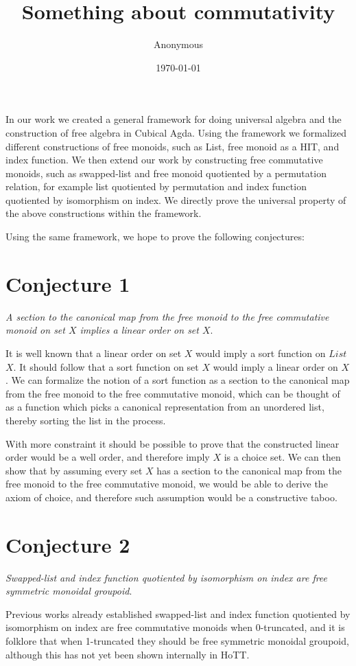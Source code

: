 \documentclass{article}
\title{Something about commutativity}
\author{Anonymous}
\date{\today}
\begin{document}
\maketitle

In our work we created a general framework for doing universal algebra and the construction of
free algebra in Cubical Agda. Using the framework we formalized different constructions of free monoids,
such as List, free monoid as a HIT, and index function. We then extend our work by constructing free commutative monoids,
such as swapped-list and free monoid quotiented by a permutation relation, for example list quotiented by permutation
and index function quotiented by isomorphism on index. We directly prove the universal property of the above constructions
within the framework.

Using the same framework, we hope to prove the following conjectures:

\section{Conjecture 1}
\textit{A section to the canonical map from the free monoid to the free commutative monoid on set $X$ implies a linear order on set $X$}.

It is well known that a linear order on set $X$ would imply a sort function on $List$ $X$. It should follow that a sort function on set $X$
would imply a linear order on $X$. We can formalize the notion of a sort function as a section to the canonical map from the free monoid to the
free commutative monoid, which can be thought of as a function which picks a canonical representation from an unordered list, thereby sorting
the list in the process.

With more constraint it should be possible to prove that the constructed linear order would be a well order, and therefore imply $X$ is a choice
set. We can then show that by assuming every set $X$ has a section to the canonical map from the free monoid to the free commutative monoid, we
would be able to derive the axiom of choice, and therefore such assumption would be a constructive taboo.

\section{Conjecture 2}
\textit{Swapped-list and index function quotiented by isomorphism on index are free symmetric monoidal groupoid}.

Previous works already established swapped-list and index function quotiented by isomorphism on index are free commutative
monoids when 0-truncated, and it is folklore that when 1-truncated they should be free symmetric monoidal groupoid, although
this has not yet been shown internally in HoTT. 
\end{document}
